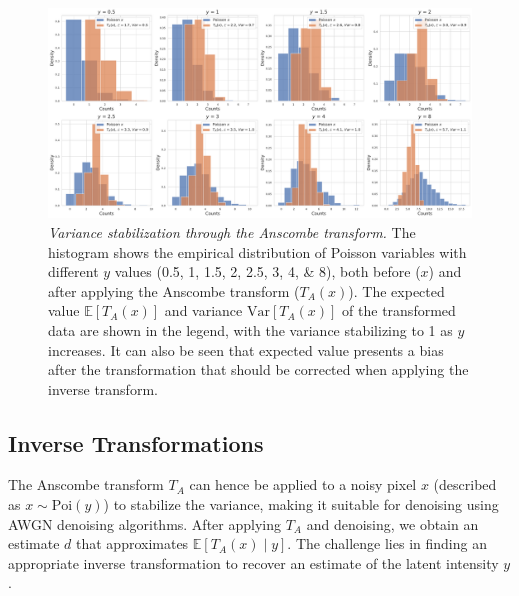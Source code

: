 \begin{figure}
    \centering
    \includegraphics[width=1\linewidth]{images/hist_anscombe.pdf}
    \caption{\textit{Variance stabilization through the Anscombe transform.} The histogram shows the empirical distribution of Poisson  variables with different $y$ values (\numlist{0.5;1;1.5;2;2.5;3;4;8}), both before ($x$) and after applying the Anscombe transform ($T_A(x)$). The expected value $\mathbb{E}[T_A(x)]$ and variance $\text{Var}[T_A(x)]$ of the transformed data are shown in the legend, with the variance stabilizing to \num{1} as $y$ increases. It can also be seen that expected value presents a bias after the transformation that should be corrected when applying the inverse transform.}
    \label{fig:hist-anscombe}
\end{figure}

\subsection{Inverse Transformations}
The Anscombe transform $T_A$ can hence be applied to a noisy pixel $x$ (described as $x \sim \text{Poi}(y)$) to stabilize the variance, making it suitable for denoising using \gls{AWGN} denoising algorithms. After applying $T_A$ and denoising, we obtain an estimate $d$ that approximates $\mathbb{E}[T_A(x) \mid y]$. The challenge lies in finding an appropriate inverse transformation to recover an estimate of the latent intensity $y$. 

